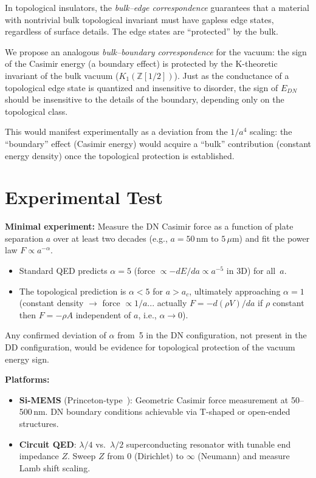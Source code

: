 \documentclass[aps,prl,twocolumn,superscriptaddress,nofootinbib]{revtex4-2}
\begin{document}
In topological insulators, the \emph{bulk--edge correspondence}
guarantees that a material with nontrivial bulk topological
invariant must have gapless edge states, regardless of surface
details.  The edge states are ``protected'' by the bulk.

We propose an analogous \emph{bulk--boundary correspondence} for
the vacuum: the sign of the Casimir energy (a boundary effect) is
protected by the K-theoretic invariant of the bulk vacuum
($K_1(\mathbb{Z}[1/2])$).  Just as the conductance of a
topological edge state is quantized and insensitive to disorder,
the sign of $E_{DN}$ should be insensitive to the details of the
boundary, depending only on the topological class.

This would manifest experimentally as a deviation from the
$1/a^4$ scaling: the ``boundary'' effect (Casimir energy) would
acquire a ``bulk'' contribution (constant energy density) once
the topological protection is established.

\section{Experimental Test}

\noindent\textbf{Minimal experiment:} Measure the DN Casimir force
as a function of plate separation $a$ over at least two decades
(e.g., $a=50$\,nm to $5\,\mu$m) and fit the power law
$F\propto a^{-\alpha}$.

\begin{itemize}
\item Standard QED predicts $\alpha=5$ (force $\propto -dE/da
\propto a^{-5}$ in 3D) for all~$a$.
\item The topological prediction is $\alpha<5$ for $a>a_c$,
ultimately approaching $\alpha=1$ (constant density $\to$
force $\propto 1/a$... actually $F=-d(\rho V)/da$ if $\rho$
constant then $F=-\rho A$ independent of $a$, i.e.,
$\alpha\to 0$).
\end{itemize}

Any confirmed deviation of $\alpha$ from~5 in the DN
configuration, not present in the DD configuration, would be
evidence for topological protection of the vacuum energy sign.

\medskip
\noindent\textbf{Platforms:}
\begin{itemize}
\item \textbf{Si-MEMS} (Princeton-type~\cite{Princeton2017}):
Geometric Casimir force measurement at 50--500\,nm.  DN boundary
conditions achievable via T-shaped or open-ended structures.
\item \textbf{Circuit QED}: $\lambda/4$ vs.\ $\lambda/2$
superconducting resonator with tunable end impedance $Z$.
Sweep $Z$ from 0 (Dirichlet) to $\infty$ (Neumann) and measure
Lamb shift scaling.
\end{itemize}
\end{document}
